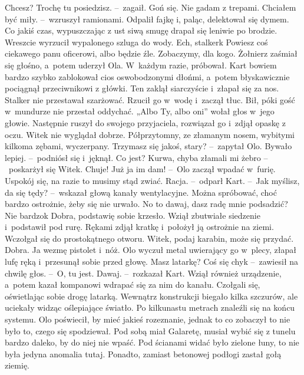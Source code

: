 \documentclass[../MAIN.tex]{subfiles}
\begin{document}
\dd
\sd
\xx Chcesz? Trochę tu posiedzisz. --~zagaił.
\xx Goń się. Nie gadam z trepami.
\xx Chciałem być miły. --~wzruszył ramionami.
\qd
\hspace{20em} Odpalił fajkę i, paląc, delektował się dymem. Co jakiś czas, wypuszczając z ust siwą smugę drapał się leniwie po brodzie. Wreszcie wyrzucił wypalonego szluga do wody.
\dd
\sd
\xx Ech, stalker\3k Powiesz coś ciekawego panu oficerowi, albo będzie źle.
\xx Zobaczymy, dla kogo.
\qd
\hspace{11em}Żołnierz zaśmiał się głośno, a~potem uderzył Ola. W~każdym razie, próbował. Kart bowiem bardzo szybko zablokował cios oswobodzonymi dłońmi, a~potem błyskawicznie pociągnął przeciwnikowi z główki. Ten zaklął siarczyście i~złapał się za nos. Stalker nie przestawał szarżować. Rzucił go w~wodę i~zaczął tłuc. Bił, póki gość w~mundurze nie przestał oddychać. „Albo Ty, albo oni” wołał głos w~jego głowie. Następnie ruszył do swojego przyjaciela, rozwiązał go i~zdjął opaskę z oczu. Witek nie wyglądał dobrze. Półprzytomny, ze złamanym nosem, wybitymi kilkoma zębami, wyczerpany.
\dd
\sd
\xx Trzymasz się jakoś, stary? --~zapytał Olo.
\xx Bywało lepiej. --~podniósł się i~jęknął.
\xx Co jest?
\xx Kurwa, chyba złamali mi żebro --~poskarżył się Witek.
\xx Chuje! Już ja im dam! --~Olo zaczął wpadać w~furię.
\xx Uspokój się, na razie to musimy stąd zwiać.
\xx Racja. --~odparł Kart. --~Jak myślisz, da się tędy? --~wskazał głową kanały wentylacyjne.
\xx Można spróbować, choć bardzo ostrożnie, żeby się nie urwało.
\xx No to dawaj, dasz radę mnie podsadzić?
\xx Nie bardzo\3k
\xx Dobra, podstawię sobie krzesło.
\qd
Wziął zbutwiałe siedzenie i~podstawił pod rurę. Rękami zdjął kratkę i~położył ją ostrożnie na ziemi. Wczołgał się do prostokątnego otworu.
\sd
\xx Witek, podaj karabin, może się przydać.
\xx Dobra. Ja wezmę pistolet i~nóż.
\qd
\hspace{15em} Olo wyczuł metal uwierający go w~plecy, złapał lufę ręką i~przesunął sobie przed głowę.
\dd
\sd
\xx Masz latarkę?
\xx Coś się chy\3k --~zawiesił na chwilę głos. --~O, tu jest.
\xx Dawaj. --~rozkazał Kart.
\qd
\hspace{11.8em} Wziął również urządzenie, a~potem kazał kompanowi wdrapać się za nim do kanału. Czołgali się, oświetlając sobie drogę latarką. Wewnątrz konstrukcji biegało kilka szczurów, ale uciekały widząc oślepiające światło.
Po kilkunastu metrach znaleźli się na końcu systemu. Olo poświecił, by mieć jakieś rozeznanie, jednak to co zobaczył to nie było to, czego się spodziewał. Pod sobą miał Galaretę, musiał wybić się z tunelu bardzo daleko, by do niej nie wpaść. Pod ścianami widać było zielone łuny, to nie była jedyna anomalia tutaj. Ponadto, zamiast betonowej podłogi zastał gołą ziemię.
\end{document}
